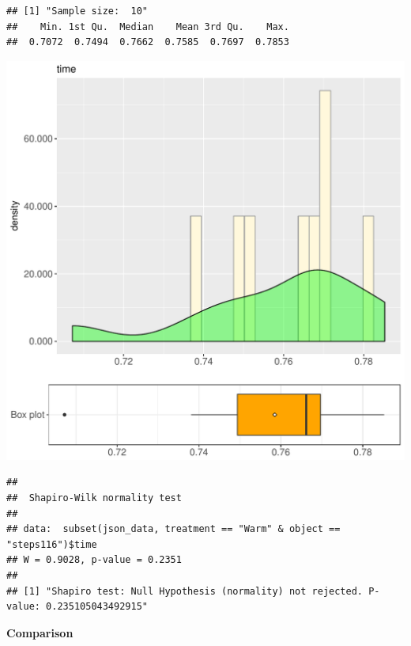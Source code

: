 \documentclass{article}\usepackage[]{graphicx}\usepackage[]{color}
\makeatletter
\def\maxwidth{ %
  \ifdim\Gin@nat@width>\linewidth
    \linewidth
  \else
    \Gin@nat@width
  \fi
}
\newenvironment{kframe}{%
 \def\at@end@of@kframe{}%
 \ifinner\ifhmode%
  \def\at@end@of@kframe{\end{minipage}}%
  \begin{minipage}{\columnwidth}%
 \fi\fi%
 \def\FrameCommand##1{\hskip\@totalleftmargin \hskip-\fboxsep
 \colorbox{shadecolor}{##1}\hskip-\fboxsep
     \hskip-\linewidth \hskip-\@totalleftmargin \hskip\columnwidth}%
 \MakeFramed {\advance\hsize-\width
   \@totalleftmargin\z@ \linewidth\hsize
   \@setminipage}}%
 {\par\unskip\endMakeFramed%
 \at@end@of@kframe}
\newenvironment{knitrout}{}{} %
\makeatother
\begin{document}
\begin{knitrout}
\color{fgcolor}\begin{kframe}
\begin{verbatim}
## [1] "Sample size:  10"
##    Min. 1st Qu.  Median    Mean 3rd Qu.    Max. 
##  0.7072  0.7494  0.7662  0.7585  0.7697  0.7853
\end{verbatim}
\end{kframe}
\includegraphics[width=\maxwidth]{figure/RH1_Warm_steps116-1} 
\begin{kframe}\begin{verbatim}
## 
## 	Shapiro-Wilk normality test
## 
## data:  subset(json_data, treatment == "Warm" & object == "steps116")$time
## W = 0.9028, p-value = 0.2351
## 
## [1] "Shapiro test: Null Hypothesis (normality) not rejected. P-value: 0.235105043492915"
\end{verbatim}
\end{kframe}
\end{knitrout}
  
 \textbf{Comparison}
  
\end{document}

